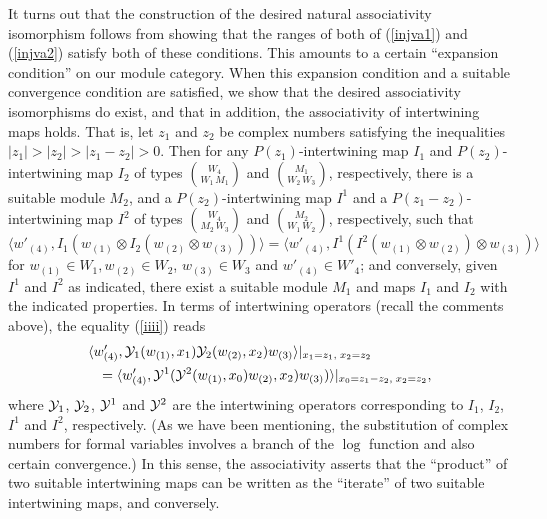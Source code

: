 \documentclass[12pt]{article}
\begin{document}
It turns out that the construction of the desired natural
associativity isomorphism follows {}from showing that the ranges of
both of (\ref{injva1}) and (\ref{injva2}) satisfy both of these
conditions.  This amounts to a certain ``expansion condition'' on our
module category.  When this expansion condition and a suitable
convergence condition are satisfied, we show that the desired
associativity isomorphisms do exist, and that in addition, the
associativity of intertwining maps holds.  That is, let $z_1$ and
$z_2$ be complex numbers satisfying the inequalities
$|z_1|>|z_2|>|z_1-z_2|>0$.  Then for any $P(z_1)$-intertwining map
$I_1$ and $P(z_2)$-intertwining map $I_2$ of types ${W_4\choose {W_1\,
M_1}}$ and ${M_1\choose {W_2\, W_3}}$, respectively, there is a
suitable module $M_2$, and a $P(z_2)$-intertwining map $I^1$ and a
$P(z_1-z_2)$-intertwining map $I^2$ of types ${W_4\choose{M_2\, W_3}}$
and ${M_2\choose{W_1\, W_2}}$, respectively, such that
\begin{equation}\label{iiii}
\langle w'_{(4)}, I_1(w_{(1)}\otimes I_2(w_{(2)}\otimes w_{(3)}))
\rangle =
\langle w'_{(4)}, I^1(I^2(w_{(1)}\otimes w_{(2)})\otimes w_{(3)})
\rangle
\end{equation}
for $w_{(1)}\in W_1, w_{(2)}\in W_2$, $w_{(3)} \in W_3$ and
$w'_{(4)}\in W'_4$; and conversely, given $I^1$ and $I^2$ as
indicated, there exist a suitable module $M_1$ and maps $I_1$ and
$I_2$ with the indicated properties.  In terms of intertwining
operators (recall the comments above), the equality (\ref{iiii}) reads
\begin{eqnarray}\label{yyyy}
\lefteqn{\langle w'_{(4)}, {\cal Y}_1(w_{(1)}, x_1){\cal
Y}_2(w_{(2)},x_2)
w_{(3)}\rangle|_{x_1=z_1,\; x_2=z_2}}\nno\\
&&=\langle w'_{(4)},{\cal Y}^1({\cal Y}^2(w_{(1)}, x_0)w_{(2)},
x_2)w_{(3)})\rangle |_{x_0=z_1-z_2,\; x_2=z_2},
\end{eqnarray}
where ${\cal Y}_1$, ${\cal Y}_2$, ${\cal Y}^1$ and ${\cal Y}^2$ are
the intertwining operators corresponding to $I_1$, $I_2$, $I^1$ and
$I^2$, respectively.  (As we have been mentioning, the substitution of
complex numbers for formal variables involves a branch of the $\log$
function and also certain convergence.)  In this sense, the
associativity asserts that the ``product'' of two suitable
intertwining maps can be written as the ``iterate'' of two suitable
intertwining maps, and conversely.
\end{document}
